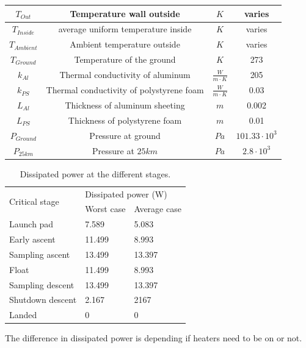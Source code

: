 \begin{table}[H]
\begin{tabular}{|c|c|c|c|}
        $T_{Out}$ & Temperature wall outside & $K$ & varies \\ \hline
        $T_{Inside}$ & average uniform temperature inside & $K$ & varies \\ \hline
        $T_{Ambient}$ & Ambient temperature outside & $K$ & varies \\ \hline
        $T_{Ground}$ & Temperature of the ground & $K$ & 273 \\ \hline
        $k_{Al}$ & Thermal conductivity of aluminum & $\frac{W}{m\cdot K}$ & 205 \\ \hline
        $k_{PS}$ & Thermal conductivity of polystyrene foam & $\frac{W}{m\cdot K}$ & 0.03 \\ \hline
        $L_{Al}$ & Thickness of aluminum sheeting & $m$ & 0.002 \\ \hline
        $L_{PS}$ & Thickness of polystyrene foam & $m$ & 0.01 \\ \hline
        $P_{Ground}$ & Pressure at ground & $Pa$ & $101.33 \cdot 10^3$ \\ \hline
        $P_{25km}$ & Pressure at $25km$ & $Pa$ & $2.8 \cdot 10^3$ \\ \hline
    \end{tabular}
    \label{tab:thermal-variables}
\end{table}

\begin{table}[H]
\centering
\caption{Dissipated power at the different stages.}
\label{tab:dissipated-power-thermal}
\begin{tabular}{|l|l|l|}
\hline
\multirow{2}{*}{Critical stage} & \multicolumn{2}{l|}{Dissipated power (W)} \\ \cline{2-3} 
                                & Worst case       & Average case       \\ \hline
Launch pad                      & 7.589            & 5.083              \\ \hline
Early ascent                    & 11.499           & 8.993              \\ \hline
Sampling ascent                 & 13.499           & 13.397             \\ \hline
Float                           & 11.499           & 8.993              \\ \hline
Sampling descent                & 13.499           & 13.397             \\ \hline
Shutdown descent                & 2.167            & 2167               \\ \hline
Landed                          & 0                & 0                  \\ \hline
\end{tabular}
\end{table}
The difference in dissipated power is depending if heaters need to be on or not.

